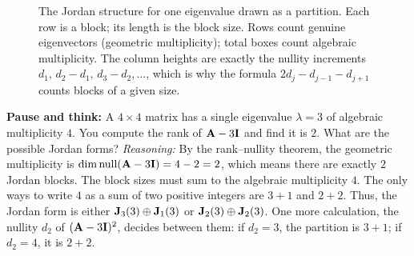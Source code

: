 \begin{figure}[H]
\centering
{}
\caption{The Jordan structure for one eigenvalue drawn as a partition. Each row is a block;
its length is the block size. Rows count genuine eigenvectors (geometric multiplicity);
total boxes count algebraic multiplicity. The column heights are exactly the nullity
increments $d_1,\,d_2-d_1,\,d_3-d_2,\dots$, which is why the formula
$2d_j-d_{j-1}-d_{j+1}$ counts blocks of a given size.}
\label{ch28:partition}
\end{figure}

\begin{recoverybox}
\textbf{Pause and think:} A $4\times 4$ matrix has a single eigenvalue $\lambda=3$ of algebraic multiplicity $4$. You compute the rank of $\mathbf{A}-3\mathbf{I}$ and find it is $2$. What are the possible Jordan forms?
\emph{Reasoning:} By the rank--nullity theorem, the geometric multiplicity is $\operatorname{dim}\operatorname{null}(\mathbf{A}-3\mathbf{I}) = 4 - 2 = 2$, which means there are exactly $2$ Jordan blocks. The block sizes must sum to the algebraic multiplicity $4$. The only ways to write $4$ as a sum of two positive integers are $3+1$ and $2+2$. Thus, the Jordan form is either $\mathbf{J}_3(3)\oplus\mathbf{J}_1(3)$ or $\mathbf{J}_2(3)\oplus\mathbf{J}_2(3)$. One more calculation, the nullity $d_2$ of $(\mathbf{A}-3\mathbf{I})^2$, decides between them: if $d_2 = 3$, the partition is $3+1$; if $d_2 = 4$, it is $2+2$.
\end{recoverybox}

